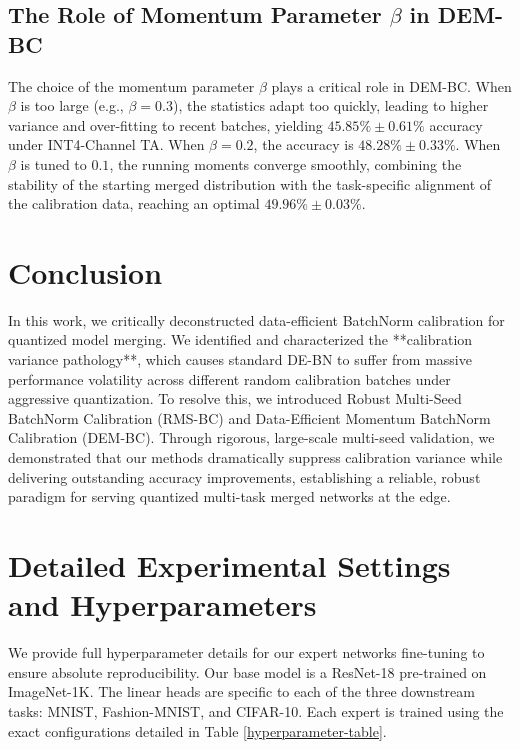\documentclass{article}
\begin{document}
\subsection{The Role of Momentum Parameter $\beta$ in DEM-BC}
The choice of the momentum parameter $\beta$ plays a critical role in DEM-BC. When $\beta$ is too large (e.g., $\beta = 0.3$), the statistics adapt too quickly, leading to higher variance and over-fitting to recent batches, yielding $45.85\% \pm 0.61\%$ accuracy under INT4-Channel TA. When $\beta = 0.2$, the accuracy is $48.28\% \pm 0.33\%$. When $\beta$ is tuned to $0.1$, the running moments converge smoothly, combining the stability of the starting merged distribution with the task-specific alignment of the calibration data, reaching an optimal $49.96\% \pm 0.03\%$.

\section{Conclusion}
In this work, we critically deconstructed data-efficient BatchNorm calibration for quantized model merging. We identified and characterized the **calibration variance pathology**, which causes standard DE-BN to suffer from massive performance volatility across different random calibration batches under aggressive quantization. To resolve this, we introduced Robust Multi-Seed BatchNorm Calibration (RMS-BC) and Data-Efficient Momentum BatchNorm Calibration (DEM-BC). Through rigorous, large-scale multi-seed validation, we demonstrated that our methods dramatically suppress calibration variance while delivering outstanding accuracy improvements, establishing a reliable, robust paradigm for serving quantized multi-task merged networks at the edge.

\clearpage



\clearpage
\appendix
\section{Detailed Experimental Settings and Hyperparameters}
We provide full hyperparameter details for our expert networks fine-tuning to ensure absolute reproducibility. Our base model is a ResNet-18 \cite{he16} pre-trained on ImageNet-1K. The linear heads are specific to each of the three downstream tasks: MNIST, Fashion-MNIST, and CIFAR-10. Each expert is trained using the exact configurations detailed in Table \ref{hyperparameter-table}.
\end{document}
